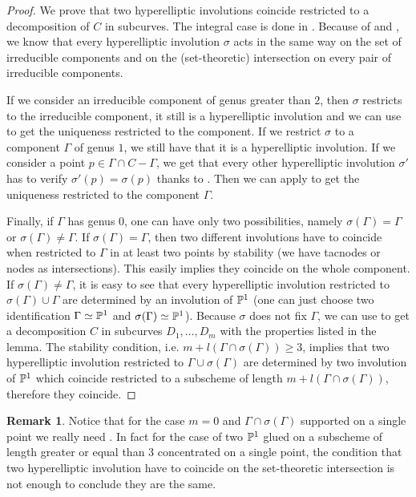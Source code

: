 \documentclass{alggeom}
\numberwithin{equation}{section}
\numberwithin{subsection}{section}
\theoremstyle{definition}
\newtheorem{remark}[theorem]{Remark}
\theoremstyle{remark}
\begin{document}
\begin{proof}
	 We prove that two hyperelliptic involutions coincide restricted to a decomposition of $C$ in subcurves.
	The integral case is done in . Because of  and , we know that every hyperelliptic involution $\sigma$ acts in the same way on the set of irreducible components and on the (set-theoretic) intersection on every pair of irreducible components. 
	
	 If we consider an irreducible component of genus greater than $2$, then $\sigma$ restricts to the irreducible component, it still is a hyperelliptic involution  and we can use  to get the uniqueness restricted to the component. If we restrict $\sigma$ to a component $\Gamma$ of genus $1$, we still have that it is a hyperelliptic involution. If we consider a point $p \in \Gamma\cap C-\Gamma$, we get that every other hyperelliptic involution $\sigma'$ has to verify $\sigma'(p)=\sigma(p)$ thanks to . Then we can apply  to get the uniqueness restricted to the component $\Gamma$. 
	  
	  Finally, if $\Gamma$ has genus $0$, one can have only two possibilities, namely $\sigma(\Gamma)=\Gamma$ or $\sigma(\Gamma)\neq \Gamma$. If $\sigma(\Gamma)=\Gamma$, then two different involutions have to coincide when restricted to $\Gamma$ in at least two points by stability (we have tacnodes or nodes as intersections). This easily implies they coincide on the whole component. If $\sigma(\Gamma)\neq \Gamma$, it is easy to see that every hyperelliptic involution restricted to $\sigma(\Gamma) \cup \Gamma$ are determined by an involution of $\mathbb{P}^1$ (one can just choose two identification $\Gamma\simeq \mathbb{P}^1$ and $\sigma(\Gamma)\simeq \mathbb{P}^1$). Because $\sigma$ does not fix $\Gamma$, we can use  to get a decomposition $C$ in subcurves $D_1,\dots,D_m$ with the properties listed in the lemma. The stability condition, i.e. $m+l(\Gamma\cap \sigma(\Gamma))\geq 3$, implies that two hyperelliptic involution restricted to $\Gamma\cup \sigma(\Gamma)$ are determined by two involution of $\mathbb{P}^1$ which coincide restricted to a subscheme of length $m+l(\Gamma\cap\sigma(\Gamma))$, therefore they coincide.
\end{proof}

\begin{remark}
	 Notice that for the case $m=0$ and $\Gamma\cap\sigma(\Gamma)$ supported on a single point we really need . In fact for the case of two $\mathbb{P}^1$ glued on a subscheme of length greater or equal than $3$ concentrated on a single point, the condition that two hyperelliptic involution have to coincide on the set-theoretic intersection is not enough to conclude they are the same. 
\end{remark}
\end{document}

